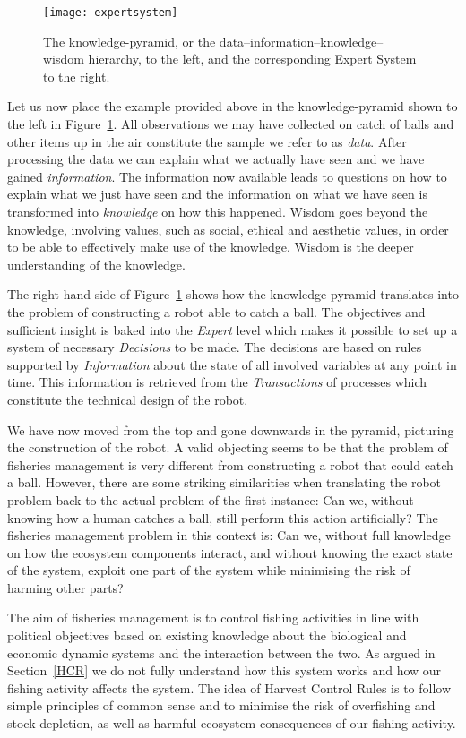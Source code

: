 \documentclass[11pt,fleqn]{book} %
\begin{document}
\begin{figure}[ht]
\centering
\texttt{[image: expertsystem]}
\caption{The knowledge-pyramid, or the data–information–knowledge–wisdom hierarchy, to the left, and the corresponding Expert System to the right\cite{Rowley2007}.}
\label{fig:expertsystem}
\end{figure}

Let us now place the example provided above in the knowledge-pyramid shown to the left in Figure~\ref{fig:expertsystem}. All observations we may have collected on catch of balls and other items up in the air constitute the sample we refer to as \textit{data}. After processing the data we can explain what we actually have seen and we have gained \textit{information}. The information now available leads to questions on how to explain what we just have seen and the information on what we have seen is transformed into \textit{knowledge} on how this happened. Wisdom goes beyond the knowledge, involving values, such as social, ethical and aesthetic values, in order to be able to effectively make use of the knowledge. Wisdom is the deeper understanding of the knowledge.

The right hand side of Figure~\ref{fig:expertsystem} shows how the knowledge-pyramid translates into the problem of constructing a robot able to catch a ball. The objectives and sufficient insight is baked into the \textit{Expert} level which makes it possible to set up a system of necessary \textit{Decisions} to be made. The decisions are based on rules supported by \textit{Information} about the state of all involved variables at any point in time. This information is retrieved from the \textit{Transactions} of processes which constitute the technical design of the robot.

We have now moved from the top and gone downwards in the pyramid, picturing the construction of the robot. A valid objecting seems to be that the problem of fisheries management is very different from constructing a robot that could catch a ball. However, there are some striking similarities when translating the robot problem back to the actual problem of the first instance: Can we, without knowing how a human catches a ball, still perform this action artificially? The fisheries management problem in this context is: Can we, without full knowledge on how the ecosystem components interact, and without knowing the exact state of the system, exploit one part of the system while minimising the risk of harming other parts?

The aim of fisheries management is to control fishing activities in line with political objectives based on existing knowledge about the biological and economic dynamic systems and the interaction between the two. As argued in Section~\ref{HCR} we do not fully understand how this system works and how our fishing activity affects the system. The idea of Harvest Control Rules is to follow simple principles of common sense and to minimise the risk of overfishing and stock depletion, as well as harmful ecosystem consequences of our fishing activity. 
\end{document}
